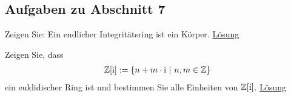 \subsection{Aufgaben zu Abschnitt 7}

\begin{exe}\label{aufgabe:7.1}
	Zeigen Sie:
	Ein endlicher Integritätsring ist ein Körper.
	\hyperlink{loes:7.1}{Lösung}
\end{exe}

\begin{exe}\label{aufgabe:7.2}
	Zeigen Sie, dass
	\begin{align*}
	\mathbb{Z}[\textrm{i}] := \lbrace n + m \cdot \textrm{i} \ | \ n,m \in \mathbb{Z} \rbrace
	\end{align*}
	ein euklidischer Ring ist und bestimmen Sie alle Einheiten von $ \mathbb{Z} [\textrm{i}] $.
	\hyperlink{loes:7.2}{Lösung}
\end{exe}

